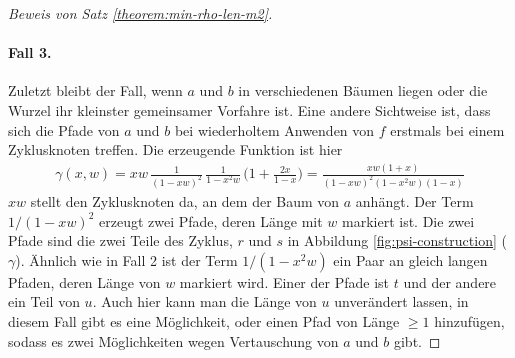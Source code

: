 \documentclass[a4paper, 10pt, ngerman]{article}
\begin{document}
\begin{proof}[Beweis von Satz \ref{theorem:min-rho-len-m2}]
        \paragraph{Fall 3.} Zuletzt bleibt der Fall, wenn $a$ und $b$ in verschiedenen Bäumen liegen oder die Wurzel ihr kleinster gemeinsamer Vorfahre ist. Eine andere Sichtweise ist, dass sich die Pfade von $a$ und $b$ bei wiederholtem Anwenden von $f$ erstmals bei einem Zyklusknoten treffen. Die erzeugende Funktion ist hier
        \begin{align*}
            \gamma(x, w)
            = xw \, \frac {1} {(1 - xw)^2} \, \frac {1} {1 - x^2w} \,
            \Bigg (1 + \frac {2x}{1 - x} \Bigg )
            = \frac {xw(1 + x)} {(1 - xw)^2(1 - x^2w)(1 - x)}
        \end{align*}
        $xw$ stellt den Zyklusknoten da, an dem der Baum von $a$ anhängt. Der Term $1/(1 - xw)^2$ erzeugt zwei Pfade, deren Länge mit $w$ markiert ist. Die zwei Pfade sind die zwei Teile des Zyklus, $r$ und $s$ in Abbildung \ref{fig:psi-construction} ($\gamma$). Ähnlich wie in Fall 2 ist der Term $1/(1 - x^2w)$ ein Paar an gleich langen Pfaden, deren Länge von $w$ markiert wird. Einer der Pfade ist $t$ und der andere ein Teil von $u$. Auch hier kann man die Länge von $u$ unverändert lassen, in diesem Fall gibt es eine Möglichkeit, oder einen Pfad von Länge $\ge 1$ hinzufügen, sodass es zwei Möglichkeiten wegen Vertauschung von $a$ und $b$ gibt.


\end{proof}
\end{document}
